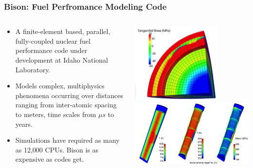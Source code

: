\begin{frame}
\frametitle{Bison: Fuel Perfromance Modeling Code}  

\begin{columns}
 \begin{column}{0.6\textwidth}

\begin{itemize}
  \item A finite-element based, parallel, fully-coupled nuclear fuel performance code under development at Idaho National Laboratory.
  \item Models complex, multiphysics phenomena occurring over distances ranging from inter-atomic spacing to meters, time scales from $\mu s$ to years. 
  \item Simulations have required as many as 12,000 CPUs. Bison is as expensive as codes get.    
\end{itemize}

 \end{column}

 \begin{column}{0.4\textwidth}
  \centering
  \includegraphics[width=1.\textwidth, totalheight=0.45\textheight]{./bison_mesh.png} \\
  \includegraphics[width=1.\textwidth, totalheight=0.45\textheight]{./bison_is_stud.png}
 \end{column}
\end{columns}


\end{frame}

